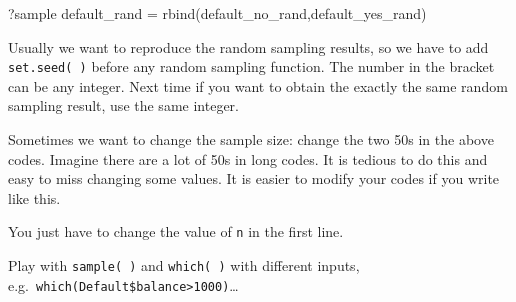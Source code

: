 \documentclass[
]{article}
\newenvironment{Shaded}{\begin{snugshade}}{\end{snugshade}}
\newcommand{\CommentTok}[1]{\textcolor[rgb]{0.56,0.35,0.01}{\textit{#1}}}
\newcommand{\DecValTok}[1]{\textcolor[rgb]{0.00,0.00,0.81}{#1}}
\newcommand{\FunctionTok}[1]{\textcolor[rgb]{0.00,0.00,0.00}{#1}}
\newcommand{\NormalTok}[1]{#1}
\newcommand{\OtherTok}[1]{\textcolor[rgb]{0.56,0.35,0.01}{#1}}
\newcommand{\SpecialCharTok}[1]{\textcolor[rgb]{0.00,0.00,0.00}{#1}}
\newcommand{\StringTok}[1]{\textcolor[rgb]{0.31,0.60,0.02}{#1}}
\begin{document}
\begin{Shaded}
\begin{Highlighting}[]
\NormalTok{?sample}
\NormalTok{default\_rand }\OtherTok{=} \FunctionTok{rbind}\NormalTok{(default\_no\_rand,default\_yes\_rand)}
\end{Highlighting}
\end{Shaded}

Usually we want to reproduce the random sampling results, so we have to
add \texttt{set.seed(\ )} before any random sampling function. The
number in the bracket can be any integer. Next time if you want to
obtain the exactly the same random sampling result, use the same
integer.

Sometimes we want to change the sample size: change the two 50s in the
above codes. Imagine there are a lot of 50s in long codes. It is tedious
to do this and easy to miss changing some values. It is easier to modify
your codes if you write like this.

\begin{Shaded}
\end{Shaded}

You just have to change the value of \texttt{n} in the first line.

Play with \texttt{sample(\ )} and \texttt{which(\ )} with different
inputs, e.g.~\texttt{which(Default\$balance\textgreater{}1000)}\ldots{}
\end{document}
